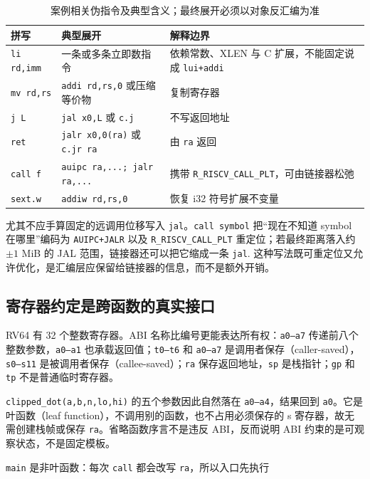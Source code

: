 \begin{table}[t]
\caption{案例相关伪指令及典型含义；最终展开必须以对象反汇编为准}
\label{tab:pseudo}
\centering
\small
\begin{tabular}{p{.18\linewidth}p{.34\linewidth}p{.38\linewidth}}
\hline
拼写 & 典型展开 & 解释边界\\
\hline
\texttt{li rd,imm} & 一条或多条立即数指令 & 依赖常数、XLEN 与 C 扩展，不能固定说成 \texttt{lui+addi}\\
\texttt{mv rd,rs} & \texttt{addi rd,rs,0} 或压缩等价物 & 复制寄存器\\
\texttt{j L} & \texttt{jal x0,L} 或 \texttt{c.j} & 不写返回地址\\
\texttt{ret} & \texttt{jalr x0,0(ra)} 或 \texttt{c.jr ra} & 由 \texttt{ra} 返回\\
\texttt{call f} & \texttt{auipc ra,...; jalr ra,...} & 携带 \texttt{R\_RISCV\_CALL\_PLT}，可由链接器松弛\\
\texttt{sext.w} & \texttt{addiw rd,rs,0} & 恢复 i32 符号扩展不变量\\
\hline
\end{tabular}
\end{table}

尤其不应手算固定的远调用位移写入 \texttt{jal}。\texttt{call symbol} 把“现在不知道 symbol 在哪里”编码为 \texttt{AUIPC+JALR} 以及 \texttt{R\_RISCV\_CALL\_PLT} 重定位；若最终距离落入约 \(\pm1\) MiB 的 JAL 范围，链接器还可以把它缩成一条 \texttt{jal}\cite{bin-riscv-psabi}. 这种写法既可重定位又允许优化，是汇编层应保留给链接器的信息，而不是额外开销。

\subsection{寄存器约定是跨函数的真实接口}

RV64 有 32 个整数寄存器。ABI 名称比编号更能表达所有权：\texttt{a0--a7} 传递前八个整数参数，\texttt{a0--a1} 也承载返回值；\texttt{t0--t6} 和 \texttt{a0--a7} 是调用者保存（caller-saved），\texttt{s0--s11} 是被调用者保存（callee-saved）；\texttt{ra} 保存返回地址，\texttt{sp} 是栈指针；\texttt{gp} 和 \texttt{tp} 不是普通临时寄存器\cite{bin-riscv-psabi}。

\texttt{clipped\_dot(a,b,n,lo,hi)} 的五个参数因此自然落在 \texttt{a0--a4}，结果回到 \texttt{a0}。它是叶函数（leaf function），不调用别的函数，也不占用必须保存的 s 寄存器，故无需创建栈帧或保存 \texttt{ra}。省略函数序言不是违反 ABI，反而说明 ABI 约束的是可观察状态，不是固定模板。

\texttt{main} 是非叶函数：每次 \texttt{call} 都会改写 \texttt{ra}，所以入口先执行

